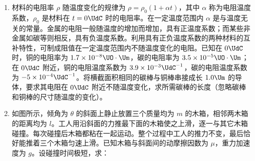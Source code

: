 \documentclass[\gkver]{gaokaozhenti}
\begin{document}
\begin{enumerate}
\item
材料的电阻率 $\rho$ 随温度变化的规律为 $\rho=\rho_{0}(1+\alpha t)$，其中 $\alpha$ 称为电阻温度系数，$\rho_{0}$ 是材料在 $t=0\UdC$ 时的电阻率。在一定温度范围内 $\alpha$ 是与温度无关的常量。金属的电阻一般随温度的增加而增加，具有正温度系数；而某些非金属如碳等则相反，具有负温度系数。利用具有正负温度系数的两种材料的互补特性，可制成阻值在一定温度范围内不随温度变化的电阻。已知在 $0\UdC$ 时，铜的电阻率为 $1.7\times10^{-8}\UO\cdot\Um$，碳的电阻率为 $3.5\times10^{-5}\UO\cdot\Um$；在 $0\UdC$ 附近，铜的电阻温度系数为 $3.9\times10^{-3}\UdC^{-1}$，碳的电阻温度系数为 $-5\times10^{-4}\UdC^{-1}$。将横截面积相同的碳棒与铜棒串接成长 $1.0\Um$ 的导体，要求其电阻在 $0\UdC$ 附近不随温度变化，求所需碳棒的长度（忽略碳棒和铜棒的尺寸随温度的变化）。



\item
如图所示，倾角为 $\theta$ 的斜面上静止放置三个质量均为 $m$ 的木箱，相邻两木箱的距离均为 $l$。工人用沿斜面的力推最下面的木箱使之上滑，逐一与其它木箱碰撞。每次碰撞后木箱都粘在一起运动。整个过程中工人的推力不变，最后恰好能推着三个木箱匀速上滑。已知木箱与斜面间的动摩擦因数为 $\mu$，重力加速度为 $g$。设碰撞时间极短，求：


\end{enumerate}
\end{document}
